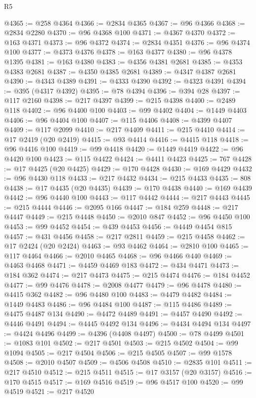 \begin{lexlean}{R5}
\begin{coremodule}
@4365 := @258 @4364
@4366 := @2834 @4365
@4367 := @96 @4366
@4368 := @2834 @2280
@4370 := @96 @4368 @100
@4371 := @4367 @4370
@4372 := @163 @4371
@4373 := @96 @4372
@4374 := @2834 @4351
@4376 := @96 @4374 @100
@4377 := @4373 @4376
@4378 := @163 @4377
@4380 := @96 @4378 @1395
@4381 := @163 @4380
@4383 := @4356 @4381 @2681
@4385 := @4353 @4383 @2681
@4387 := @4350 @4385 @2681
@4389 := @4347 @4387 @2681
@4390 := @4343 @4389
@4391 := @4333 @4390
@4392 := @4323 @4391
@4394 := @395 (@4317 @4392)
@4395 := @78 @4394
@4396 := @394 @28
@4397 := @117 @2160
@4398 := @217 @4397
@4399 := @215 @4398
@4400 := @2489 @118
@4402 := @96 @4400 @100
@4403 := @99 @4402
@4404 := @1449 @4403
@4406 := @96 @4404 @100
@4407 := @115 @4406
@4408 := @4399 @4407
@4409 := @117 @2099
@4410 := @217 @4409
@4411 := @215 @4410
@4414 := @17 @2419 (@20 @2419)
@4415 := @93 @4414
@4416 := @4415 @118
@4418 := @96 @4416 @100
@4419 := @99 @4418
@4420 := @1449 @4419
@4422 := @96 @4420 @100
@4423 := @115 @4422
@4424 := @4411 @4423
@4425 := 767
@4428 := @17 @4425 (@20 @4425)
@4429 := @170 @4428
@4430 := @169 @4429
@4432 := @96 @4430 @118
@4433 := @217 @4432
@4434 := @215 @4433
@4435 := 808
@4438 := @17 @4435 (@20 @4435)
@4439 := @170 @4438
@4440 := @169 @4439
@4442 := @96 @4440 @100
@4443 := @117 @4442
@4444 := @217 @4443
@4445 := @215 @4444
@4446 := @2095 @166
@4447 := @184 @259
@4448 := @217 @4447
@4449 := @215 @4448
@4450 := @2010 @847
@4452 := @96 @4450 @100
@4453 := @99 @4452
@4454 := @439 @4453
@4456 := @4449 @4454 @815
@4457 := @431 @4456
@4458 := @217 @2811
@4459 := @215 @4458
@4462 := @17 @2424 (@20 @2424)
@4463 := @93 @4462
@4464 := @2810 @100
@4465 := @117 @4464
@4466 := @2010 @4465
@4468 := @96 @4466 @440
@4469 := @4463 @4468
@4471 := @4459 @4469 @183
@4472 := @434 @4471
@4473 := @184 @362
@4474 := @217 @4473
@4475 := @215 @4474
@4476 := @184 @4452
@4477 := @99 @4476
@4478 := @2008 @4477
@4479 := @96 @4478
@4480 := @4415 @362
@4482 := @96 @4480 @100
@4483 := @4479 @4482
@4484 := @1449 @4483
@4486 := @96 @4484 @100
@4487 := @115 @4486
@4489 := @4475 @4487 @134
@4490 := @4472 @4489
@4491 := @4457 @4490
@4492 := @4446 @4491
@4494 := @4445 @4492 @134
@4496 := @4434 @4494 @134
@4497 := @4424 @4496
@4499 := @4396 (@4408 @4497)
@4500 := @78 @4499
@4501 := @1083 @101
@4502 := @217 @4501
@4503 := @215 @4502
@4504 := @99 @1094
@4505 := @217 @4504
@4506 := @215 @4505
@4507 := @99 @1578
@4508 := @2010 @4507
@4509 := @4506 @4508
@4510 := @2835 @101
@4511 := @217 @4510
@4512 := @215 @4511
@4515 := @17 @3157 (@20 @3157)
@4516 := @170 @4515
@4517 := @169 @4516
@4519 := @96 @4517 @100
@4520 := @99 @4519
@4521 := @217 @4520

\end{coremodule}
\end{lexlean}
